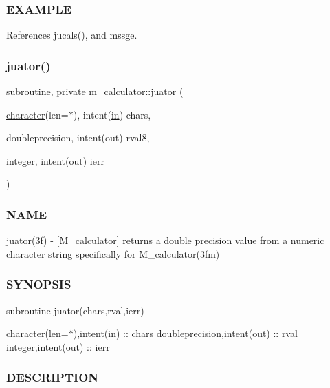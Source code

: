 \subsubsection*{E\+X\+A\+M\+P\+LE}

References jucals(), and mssge.

\mbox{\label{namespacem__calculator_a99dafdeb0fe1a589face7a3eaf5c66bd}} 
\subsubsection{\texorpdfstring{juator()}{juator()}}
{\footnotesize\ttfamily \hyperlink{M__stopwatch_83_8txt_acfbcff50169d691ff02d4a123ed70482}{subroutine}, private m\+\_\+calculator\+::juator (\begin{DoxyParamCaption}\item[{\hyperlink{option__stopwatch_83_8txt_abd4b21fbbd175834027b5224bfe97e66}{character}(len=$\ast$), intent(\hyperlink{M__journal_83_8txt_afce72651d1eed785a2132bee863b2f38}{in})}]{chars,  }\item[{doubleprecision, intent(out)}]{rval8,  }\item[{integer, intent(out)}]{ierr }\end{DoxyParamCaption})\hspace{0.3cm}{\ttfamily [private]}}



\subsubsection*{N\+A\+ME}

juator(3f) -\/ \mbox{[}M\+\_\+calculator\mbox{]} returns a double precision value from a numeric character string specifically for M\+\_\+calculator(3fm) \subsubsection*{S\+Y\+N\+O\+P\+S\+IS}

subroutine juator(chars,rval,ierr)

character(len=$\ast$),intent(in) \+:\+: chars doubleprecision,intent(out) \+:\+: rval integer,intent(out) \+:\+: ierr

\subsubsection*{D\+E\+S\+C\+R\+I\+P\+T\+I\+ON}

